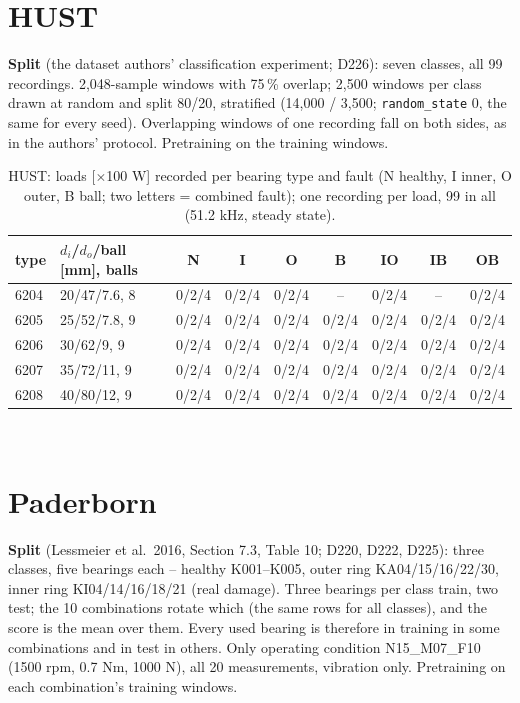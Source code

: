 \section{HUST}
\textbf{Split} (the dataset authors' classification experiment; D226): seven classes, all 99 recordings. 2,048-sample windows with 75\,\% overlap; 2,500 windows per class drawn at random and split 80/20, stratified (14,000 / 3,500; \texttt{random\_state} 0, the same for every seed). Overlapping windows of one recording fall on both sides, as in the authors' protocol. Pretraining on the training windows.

\begin{table}[ht]
\centering
\footnotesize
\begin{tabular}{llccccccc}
\toprule
type & $d_i$/$d_o$/ball [mm], balls & N & I & O & B & IO & IB & OB \\
\midrule
6204 & 20/47/7.6, 8 & \cellcolor{bothc}0/2/4 & \cellcolor{bothc}0/2/4 & \cellcolor{bothc}0/2/4 & -- & \cellcolor{bothc}0/2/4 & -- & \cellcolor{bothc}0/2/4 \\
6205 & 25/52/7.8, 9 & \cellcolor{bothc}0/2/4 & \cellcolor{bothc}0/2/4 & \cellcolor{bothc}0/2/4 & \cellcolor{bothc}0/2/4 & \cellcolor{bothc}0/2/4 & \cellcolor{bothc}0/2/4 & \cellcolor{bothc}0/2/4 \\
6206 & 30/62/9, 9 & \cellcolor{bothc}0/2/4 & \cellcolor{bothc}0/2/4 & \cellcolor{bothc}0/2/4 & \cellcolor{bothc}0/2/4 & \cellcolor{bothc}0/2/4 & \cellcolor{bothc}0/2/4 & \cellcolor{bothc}0/2/4 \\
6207 & 35/72/11, 9 & \cellcolor{bothc}0/2/4 & \cellcolor{bothc}0/2/4 & \cellcolor{bothc}0/2/4 & \cellcolor{bothc}0/2/4 & \cellcolor{bothc}0/2/4 & \cellcolor{bothc}0/2/4 & \cellcolor{bothc}0/2/4 \\
6208 & 40/80/12, 9 & \cellcolor{bothc}0/2/4 & \cellcolor{bothc}0/2/4 & \cellcolor{bothc}0/2/4 & \cellcolor{bothc}0/2/4 & \cellcolor{bothc}0/2/4 & \cellcolor{bothc}0/2/4 & \cellcolor{bothc}0/2/4 \\
\bottomrule
\end{tabular}
\\[4pt] \splitlegend
\caption{HUST: loads [$\times$100 W] recorded per bearing type and fault (N healthy, I inner, O outer, B ball; two letters = combined fault); one recording per load, 99 in all (51.2 kHz, steady state).}
\end{table}

\section{Paderborn}
\textbf{Split} (Lessmeier et al.\ 2016, Section 7.3, Table 10; D220, D222, D225): three classes, five bearings each -- healthy K001--K005, outer ring KA04/15/16/22/30, inner ring KI04/14/16/18/21 (real damage). Three bearings per class train, two test; the 10 combinations rotate which (the same rows for all classes), and the score is the mean over them. Every used bearing is therefore in training in some combinations and in test in others. Only operating condition N15\_M07\_F10 (1500 rpm, 0.7 Nm, 1000 N), all 20 measurements, vibration only. Pretraining on each combination's training windows.


